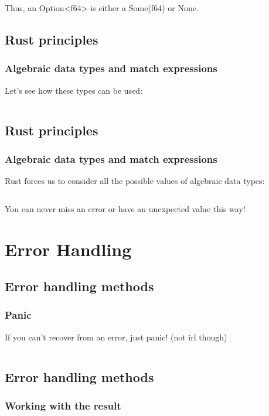 \documentclass[usenames,twocolumn,dvipsnames,10pt,a4wide]{article}
\begin{document}
Thus, an Option<f64>
is either a Some(f64)
or None.

\subsection{Rust principles}
\subsubsection{Algebraic data types and match expressions}
\large	
Let's see how these types can be used:

\inputminted[fontsize=\normalsize]{rust}{code/option2.rs}


\subsection{Rust principles}
\subsubsection{Algebraic data types and match expressions}
\large
Rust forces us to consider all the possible values
of algebraic data types:

\inputminted[fontsize=\normalsize]{rust}{code/option3.rs}

You can never miss an error or have an unexpected value this way!




\section{Error Handling}

\subsection{Error handling methods}
	\subsubsection{Panic}
\large
If you can't recover from an error, just panic!
(not irl though)

\inputminted[fontsize=\normalsize]{rust}{code/error1.rs}
\normalsize


\subsection{Error handling methods}
\subsubsection{Working with the result}
\end{document}
